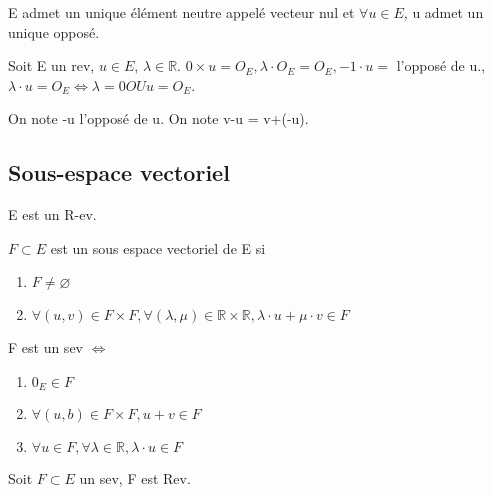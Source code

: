 \documentclass[french]{yLectureNote}
\newcommand{\R}[0]{\mathbb{R}}
\begin{document}
\begin{proposition}
E admet un unique élément neutre appelé vecteur nul et \(\forall u\in E\), u admet un unique opposé.
\end{proposition}
\begin{proposition}
Soit E un rev, \(u\in E\), \(\lambda \in \R\). \(0\times u = O_E, \lambda \cdot O_E = O_E, -1\cdot u =\) l'opposé de u., \(\lambda\cdot u = O_E \iff \lambda = 0 OU u=O_E\).
\end{proposition}
On note -u l'opposé de u. On note v-u = v+(-u).
\subsection{Sous-espace vectoriel}
E est un R-ev.
\begin{definition}
\(F\subset E\) est un sous espace vectoriel de E si
\begin{enumerate}
 \item \(F\neq \varnothing\)
 \item \(\forall (u,v) \in F\times F, \forall (\lambda,\mu)\in\R\times \R, \lambda \cdot u+ \mu \cdot v \in F\)
\end{enumerate}

\end{definition}
\begin{proposition}
F est un sev \(\iff\)
\begin{enumerate}
 \item \(0_E \in F\)
 \item \(\forall (u,b) \in F\times F, u+v \in F\)
 \item \(\forall u\in F, \forall \lambda \in\R, \lambda \cdot u \in F\)
\end{enumerate}
\end{proposition}

\begin{proposition}
Soit \(F\subset E\) un sev, F est Rev.
\end{proposition}
\end{document}

